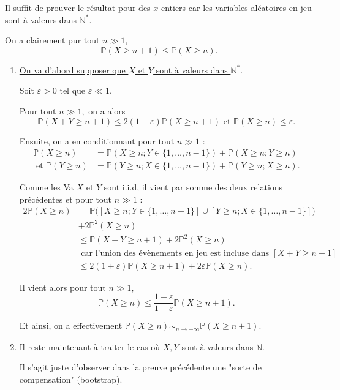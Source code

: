Il suffit de prouver le résultat pour des $x$ entiers car les variables aléatoires en jeu sont à valeurs dans $\mathbb{N}^{*}.$

On a clairement pur tout $n\gg1,$ $$\mathbb{P}(X\geq n+1)\leq \mathbb{P}(X\geq n).$$

\begin{enumerate}
    \item \underline{ On va d'abord supposer que $X$ et $Y$ sont à valeurs dans $\mathbb{N}^{*}.$}


Soit $\varepsilon>0$ tel que $\varepsilon\ll1.$

Pour tout $n\gg1,$ on a alors $$\mathbb{P}(X+Y\geq n+1)\leq 2(1+\varepsilon)\mathbb{P}(X\geq n+1) \mbox{ et } \mathbb{P}(X\geq n)\leq \varepsilon.$$ 

Ensuite, on a en conditionnant pour tout $n\gg1$ :
\begin{align*}
\mathbb{P}(X\geq n) & =\mathbb{P}(X\geq n;Y\in\{1,\ldots,n-1\})+\mathbb{P}(X\geq n;Y\geq n)\\
\mbox{ et } \mathbb{P}(Y\geq n) & =\mathbb{P}(Y\geq n;X\in\{1,\ldots,n-1\})+\mathbb{P}(Y\geq n;X\geq n).
\end{align*}

Comme les Va $X$ et $Y$ sont i.i.d, il vient par somme des deux relations précédentes et pour tout $n\gg1$ :
\begin{align*}
2\mathbb{P}(X\geq n) & = \mathbb{P}\big([X\geq n;Y\in\{1,\ldots,n-1\}]\cup[Y\geq n;X\in\{1,\ldots,n-1\}] \big)\\
&+2\mathbb{P}^{2}(X\geq n)\\
& \leq \mathbb{P}(X+Y\geq n+1)+2\mathbb{P}^{2}(X\geq n)\\
& \mbox{ car l'union des évènements en jeu est incluse dans } [X+Y\geq n+1]\\ 
&\leq 2(1+\varepsilon)\mathbb{P}(X\geq n+1) +2\varepsilon \mathbb{P}(X\geq n).
\end{align*}

Il vient alors pour tout $n\gg 1,$ $$\mathbb{P}(X\geq n)\leq \frac{1+\varepsilon}{1-\varepsilon}\mathbb{P}(X\geq n+1).$$

Et ainsi, on a effectivement $\displaystyle \mathbb{P}(X\geq n)\sim_{n\rightarrow +\infty} \mathbb{P}(X\geq n+1).$

\item \underline{Il reste maintenant à traiter le cas où $X,Y$ sont à valeurs dans $\mathbb{N}.$}

Il s'agit juste d'observer dans la preuve précédente une "sorte de compensation" (bootstrap).


\end{enumerate}
